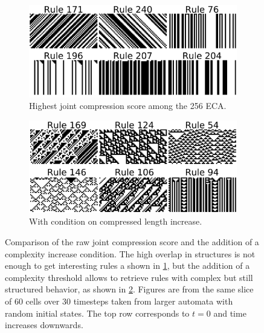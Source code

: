 \begin{figure}[htbp]
  \centering
  \begin{subfigure}[b]{.45\linewidth}
    \centering
    \includegraphics[width=\linewidth]{figures/high_eca_joint}
    \caption{Highest joint compression score among the 256 ECA.}
    \label{fig:high_eca_joint}
  \end{subfigure}
  \begin{subfigure}[b]{.45\linewidth}
    \centering
    \includegraphics[width=\linewidth]{figures/high_eca_joint+comp}
    \caption{With condition on compressed length increase.}
    \label{fig:high_eca_joint+comp}
  \end{subfigure}

  \caption{Comparison of the raw joint compression score and the addition of a
    complexity increase condition. The high overlap in structures is not enough
    to get interesting rules a shown in \ref{fig:high_eca_joint}, but the
    addition of a complexity threshold allows to retrieve rules with complex but
    still structured behavior, as shown in \ref{fig:high_eca_joint+comp}.
    Figures are from the same slice of 60 cells over 30 timesteps taken from
    larger automata with random initial states. The top row corresponds to $t =
    0$ and time increases downwards.}
  \label{fig:joint_highest}
\end{figure}

